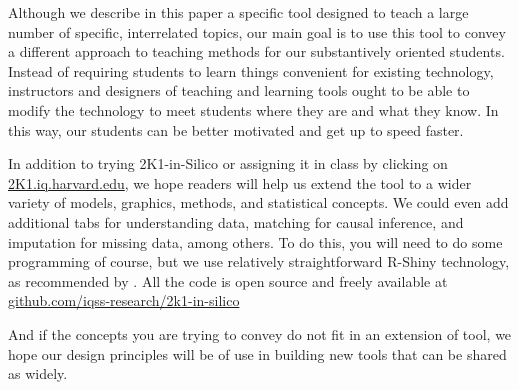 \documentclass[12pt]{article}
\theoremstyle{definition}
\begin{document}
Although we describe in this paper a specific tool designed to teach a large number of specific, interrelated topics, our main goal is to use this tool to convey a different approach to teaching methods for our substantively oriented students. Instead of requiring students to learn things convenient for existing technology, instructors and designers of teaching and learning tools ought to be able to modify the technology to meet students where they are and what they know. In this way, our students can be better motivated and get up to speed faster.

In addition to trying 2K1-in-Silico or assigning it in class by clicking on \href{https://2k1.iq.harvard.edu}{2K1.iq.harvard.edu}, we hope readers will help us extend the tool to a wider variety of models, graphics, methods, and statistical concepts. We could even add additional tabs for understanding data, matching for causal inference, and imputation for missing data, among others. To do this, you will need to do some programming of course, but we use relatively straightforward R-Shiny technology, as recommended by \citet{Metzger2022}. All the code is open source and freely available at \href{https://github.com/iqss-research/2k1-in-silico}{github.com/iqss-research/2k1-in-silico}

And if the concepts you are trying to convey do not fit in an extension of tool, we hope our design principles will be of use in building new tools that can be shared as widely.


\singlespace
\printbibliography
\end{document}
